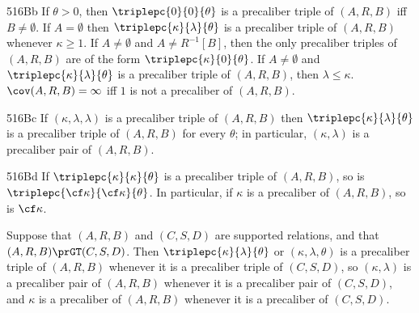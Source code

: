 \spheader 516Bb If $\theta>0$, then $\triplepc{0}{0}{\theta}$ is a
precaliber triple of
$(A,R,B)$ iff $B\ne\emptyset$.   If $A=\emptyset$ then
$\triplepc{\kappa}{\lambda}{\theta}$ is a precaliber triple of $(A,R,B)$
whenever $\kappa\ge 1$.   If $A\ne\emptyset$ and
$A\ne R^{-1}[B]$, then the only precaliber triples of $(A,R,B)$
are of the form $\triplepc{\kappa}{0}{\theta}$.   If $A\ne\emptyset$ and
$\triplepc{\kappa}{\lambda}{\theta}$ is a precaliber triple of
$(A,R,B)$, then $\lambda\le\kappa$.   $\cov(A,R,B)=\infty$ iff $1$ is
not a precaliber of $(A,R,B)$.

\spheader 516Bc If $(\kappa,\lambda,\lambda)$ is a precaliber triple of
$(A,R,B)$ then $\triplepc{\kappa}{\lambda}{\theta}$ is a precaliber
triple of $(A,R,B)$ for every $\theta$;  in particular,
$(\kappa,\lambda)$ is a precaliber pair of $(A,R,B)$.

\spheader 516Bd If $\triplepc{\kappa}{\kappa}{\theta}$ is a precaliber
triple of $(A,R,B)$, so is $\triplepc{\cf\kappa}{\cf\kappa}{\theta}$.
In particular, if $\kappa$ is a precaliber of $(A,R,B)$, so is
$\cf\kappa$.

 Suppose that $(A,R,B)$ and $(C,S,D)$ are
supported relations, and that $(A,R,B)\prGT(C,S,D)$.   Then
$\triplepc{\kappa}{\lambda}{\theta}$ or $(\kappa,\lambda,\theta)$ is a
precaliber triple of $(A,R,B)$
whenever it is a precaliber triple of $(C,S,D)$, so $(\kappa,\lambda)$
is a precaliber pair of $(A,R,B)$ whenever it is a precaliber pair of
$(C,S,D)$, and $\kappa$ is a precaliber of $(A,R,B)$ whenever it is a
precaliber of $(C,S,D)$.

